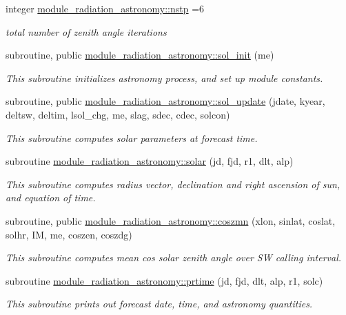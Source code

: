 \begin{DoxyCompactItemize}
integer \hyperlink{group__module__radiation__astronomy_gab93fe36440da3cc1f1d64cae2ec4c25b}{module\+\_\+radiation\+\_\+astronomy\+::nstp} =6
\begin{DoxyCompactList}\small\item\em total number of zenith angle iterations \end{DoxyCompactList}\item 
subroutine, public \hyperlink{group__module__radiation__astronomy_gaa9eeb5462c1dbddb971cee28eb38ca47}{module\+\_\+radiation\+\_\+astronomy\+::sol\+\_\+init} (me)
\begin{DoxyCompactList}\small\item\em This subroutine initializes astronomy process, and set up module constants. \end{DoxyCompactList}\item 
subroutine, public \hyperlink{group__module__radiation__astronomy_ga095550b8122f922ad122db44aa262b15}{module\+\_\+radiation\+\_\+astronomy\+::sol\+\_\+update} (jdate, kyear, deltsw, deltim, lsol\+\_\+chg, me, slag, sdec, cdec, solcon)
\begin{DoxyCompactList}\small\item\em This subroutine computes solar parameters at forecast time. \end{DoxyCompactList}\item 
subroutine \hyperlink{group__module__radiation__astronomy_ga33f3a3fbb7f232aab2a624025c991890}{module\+\_\+radiation\+\_\+astronomy\+::solar} (jd, fjd, r1, dlt, alp)
\begin{DoxyCompactList}\small\item\em This subroutine computes radius vector, declination and right ascension of sun, and equation of time. \end{DoxyCompactList}\item 
subroutine, public \hyperlink{group__module__radiation__astronomy_ga804e1504ae720d0f33b507e7c42b6506}{module\+\_\+radiation\+\_\+astronomy\+::coszmn} (xlon, sinlat, coslat, solhr, IM, me, coszen, coszdg)
\begin{DoxyCompactList}\small\item\em This subroutine computes mean cos solar zenith angle over SW calling interval. \end{DoxyCompactList}\item 
subroutine \hyperlink{group__module__radiation__astronomy_gaee29441c2e62c44728b10915a148cccf}{module\+\_\+radiation\+\_\+astronomy\+::prtime} (jd, fjd, dlt, alp, r1, solc)
\begin{DoxyCompactList}\small\item\em This subroutine prints out forecast date, time, and astronomy quantities. \end{DoxyCompactList}\end{DoxyCompactItemize}
